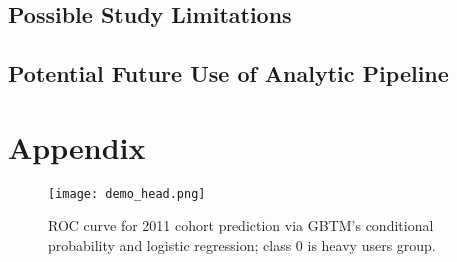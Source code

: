 \documentclass[twoside,11pt]{article}
\begin{document}

\subsection{Possible Study Limitations}

\subsection{Potential Future Use of Analytic Pipeline}


\appendix
\section*{Appendix}

\begin{figure}[h]
\begin{center}
\texttt{[image: demo\_head.png]}
\end{center}
\caption{ROC curve for 2011 cohort prediction via GBTM's conditional probability and logistic regression; class 0 is heavy users group.}
\label{fig:ROC_logistic}
\end{figure}
\end{document}
